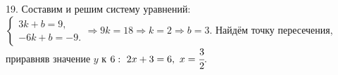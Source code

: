 19. Составим и решим систему уравнений: $\begin{cases} 3k+b=9,\\ -6k+b=-9.\end{cases}\Rightarrow 9k=18\Rightarrow k=2\Rightarrow b=3.$ Найдём точку пересечения, приравняв значение $y$ к $6:\ 2x+3=6,\ x=\cfrac{3}{2}.$\\
